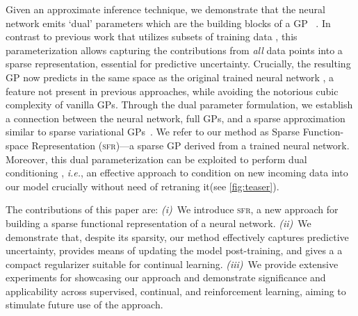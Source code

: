 \documentclass{article}
\makeatletter
\newcommand{\ie}{\textit{i.e.\@}\xspace}
\newcommand{\our}{\textsc{sfr}\xspace}
\makeatother
\begin{document}
Given an approximate inference technique, we demonstrate that the neural network emits `dual' parameters which are the building blocks of a GP~\cite{csato2002sparse, adam2021dual, chang2020fast} . In contrast to previous work that utilizes subsets of training data \cite{immer2021scalable},
this parameterization allows capturing the contributions from {\em all} data points into a sparse representation, essential for predictive uncertainty. Crucially, the resulting GP now predicts in the same space as the original trained neural network , a feature not present in previous approaches, while avoiding the notorious cubic complexity of vanilla GPs. Through the dual parameter formulation, we establish a connection between the neural network, full GPs, and a sparse approximation similar to sparse variational GPs~\cite{titsias2009variational}. We refer to our method as Sparse Function-space Representation (\our)---a sparse GP derived from a trained neural network. Moreover, this dual parameterization can be exploited to perform dual conditioning \citep{chang2022fantasizing}, \ie, an effective approach to condition on new incoming data into our model crucially without need of retraning it(see \cref{fig:teaser}).



The contributions of this paper are:
%
{\em (i)}~We introduce \our, a new approach for building a sparse functional representation of a neural network.
{\em (ii)}~We demonstrate that, despite its sparsity, our method effectively captures predictive uncertainty, provides means of updating the model post-training, and gives a a compact regularizer suitable for continual learning.
{\em (iii)}~We provide extensive experiments for showcasing our approach and demonstrate significance and applicability across supervised, continual, and reinforcement learning, aiming to stimulate future use of the approach.
\end{document}
